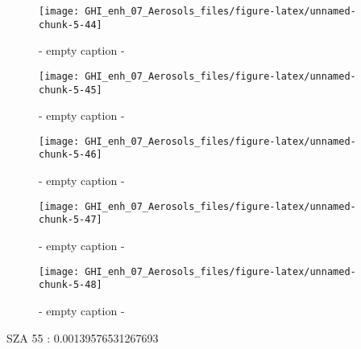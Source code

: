 \documentclass[
  10pt,
  a4paper,oneside]{article}
\begin{document}
\begin{figure}[H]

{\centering \texttt{[image: GHI\_enh\_07\_Aerosols\_files/figure-latex/unnamed-chunk-5-44]} 

}

\caption{ - empty caption - }\label{fig:unnamed-chunk-5-44}
\end{figure}
\begin{figure}[H]

{\centering \texttt{[image: GHI\_enh\_07\_Aerosols\_files/figure-latex/unnamed-chunk-5-45]} 

}

\caption{ - empty caption - }\label{fig:unnamed-chunk-5-45}
\end{figure}
\begin{figure}[H]

{\centering \texttt{[image: GHI\_enh\_07\_Aerosols\_files/figure-latex/unnamed-chunk-5-46]} 

}

\caption{ - empty caption - }\label{fig:unnamed-chunk-5-46}
\end{figure}
\begin{figure}[H]

{\centering \texttt{[image: GHI\_enh\_07\_Aerosols\_files/figure-latex/unnamed-chunk-5-47]} 

}

\caption{ - empty caption - }\label{fig:unnamed-chunk-5-47}
\end{figure}
\begin{figure}[H]

{\centering \texttt{[image: GHI\_enh\_07\_Aerosols\_files/figure-latex/unnamed-chunk-5-48]} 

}

\caption{ - empty caption - }\label{fig:unnamed-chunk-5-48}
\end{figure}

SZA 55 : 0.00139576531267693
\end{document}

